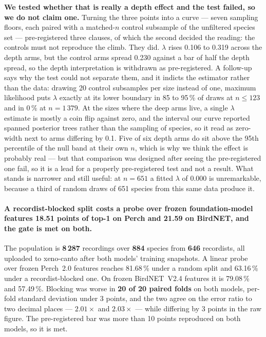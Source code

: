 \documentclass[10pt,twocolumn,a4paper]{article}
\begin{document}
\textbf{We tested whether that is really a depth effect and the test failed, so we do not
claim one.} Turning the three points into a curve --- seven sampling floors, each paired with
a matched-$n$ control subsample of the unfiltered species set --- pre-registered three
clauses, of which the second decided the reading: the controls must not reproduce the climb.
They did. $\lambda$ rises 0.106 to 0.319 across the depth arms, but the control arms spread
0.230 against a bar of half the depth spread, so the depth interpretation is withdrawn as
pre-registered. A follow-up says why the test could not separate them, and it indicts the
estimator rather than the data: drawing 20 control subsamples per size instead of one,
maximum likelihood puts $\lambda$ exactly at its lower boundary in 85 to 95\,\% of draws at
$n \le 123$ and in 0\,\% at $n = 1\,379$. At the sizes where the deep arms live, a single
$\lambda$ estimate is mostly a coin flip against zero, and the interval our curve reported
spanned posterior trees rather than the sampling of species, so it read as zero-width next to
arms differing by 0.1. Five of six depth arms do sit above the 95th percentile of the null
band at their own $n$, which is why we think the effect is probably real --- but that
comparison was designed after seeing the pre-registered one fail, so it is a lead for a
properly pre-registered test and not a result. What stands is narrower and still useful: at
$n = 651$ a fitted $\lambda$ of $0.000$ is unremarkable, because a third of random draws of
651 species from this same data produce it.

\paragraph{A recordist-blocked split costs a probe over frozen foundation-model features
18.51 points of top-1 on Perch and 21.59 on BirdNET, and the gate is met on both.} The
population is \textbf{8\,287} recordings over \textbf{884} species from \textbf{646} recordists,
all uploaded to xeno-canto after both models' training snapshots. A linear probe over frozen
Perch~2.0 features reaches 81.68\,\% under a random split and 63.16\,\% under a
recordist-blocked one. On frozen BirdNET~V2.4 features it is 79.08\,\% and 57.49\,\%. Blocking
was worse in \textbf{20 of 20 paired folds} on both models, per-fold standard deviation under 3
points, and the two agree on the error ratio to two decimal places --- $2.01\times$ and
$2.03\times$ --- while differing by 3 points in the raw figure. The pre-registered bar was more
than 10 points reproduced on both models, so it is met.
\end{document}
